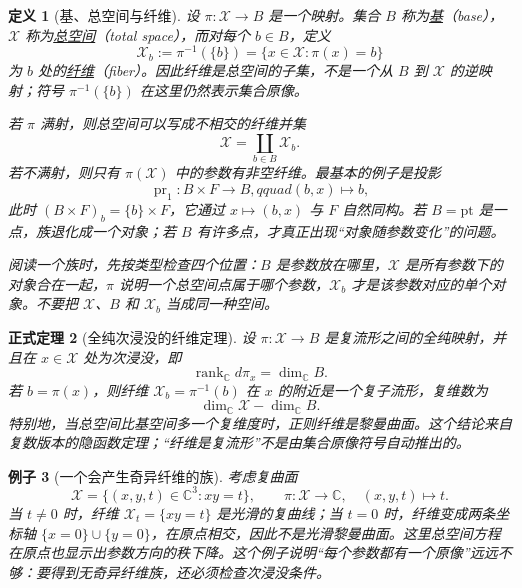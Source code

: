 \documentclass[UTF8,fontset=none,a4paper,11pt]{ctexart}
\theoremstyle{foundation-definition}
\newtheorem{definition}{定义}[section]
\theoremstyle{foundation-theorem}
\newtheorem{theorem}[definition]{正式定理}
\theoremstyle{foundation-proposition}
\theoremstyle{foundation-example}
\newtheorem{example}[definition]{例子}
\theoremstyle{foundation-remark}
\theoremstyle{foundation-theorem}
\newcommand{\term}[2]{\hyperref[#1]{#2}}
\begin{document}
\begin{definition}[基、总空间与纤维]\label{def:base-fiber}
设 \(\pi:\mathcal X\to B\) 是一个映射。集合 \(B\) 称为\term{def:base-fiber}{基}（base），\(\mathcal X\) 称为\term{def:base-fiber}{总空间}（total space），而对每个 \(b\in B\)，定义
\[
  \mathcal X_b:=\pi^{-1}(\{b\})
  =\{x\in\mathcal X:\pi(x)=b\}
\]
为 \(b\) 处的\term{def:base-fiber}{纤维}（fiber）。因此纤维是总空间的子集，不是一个从 \(B\) 到 \(\mathcal X\) 的逆映射；符号 \(\pi^{-1}(\{b\})\) 在这里仍然表示集合原像。

若 \(\pi\) 满射，则总空间可以写成不相交的纤维并集
\[
  \mathcal X=\coprod_{b\in B}\mathcal X_b.
\]
若不满射，则只有 \(\pi(\mathcal X)\) 中的参数有非空纤维。最基本的例子是投影
\[
  \operatorname{pr}_1:B\times F\to B,qquad (b,x)\longmapsto b,
\]
此时 \((B\times F)_b=\{b\}\times F\)，它通过 \(x\mapsto(b,x)\) 与 \(F\) 自然同构。若 \(B=\mathrm{pt}\) 是一点，族退化成一个对象；若 \(B\) 有许多点，才真正出现“对象随参数变化”的问题。

阅读一个族时，先按类型检查四个位置：\(B\) 是参数放在哪里，\(\mathcal X\) 是所有参数下的对象合在一起，\(\pi\) 说明一个总空间点属于哪个参数，\(\mathcal X_b\) 才是该参数对应的单个对象。不要把 \(\mathcal X\)、\(B\) 和 \(\mathcal X_b\) 当成同一种空间。
\end{definition}

\begin{theorem}[全纯次浸没的纤维定理]\label{thm:fiber-submanifold}
设 \(\pi:\mathcal X\to B\) 是复流形之间的全纯映射，并且在 \(x\in\mathcal X\) 处为次浸没，即
\[
  \operatorname{rank}_{\mathbb C}d\pi_x=\dim_{\mathbb C}B.
\]
若 \(b=\pi(x)\)，则纤维 \(\mathcal X_b=\pi^{-1}(b)\) 在 \(x\) 的附近是一个复子流形，复维数为
\[
  \dim_{\mathbb C}\mathcal X-\dim_{\mathbb C}B.
\]
特别地，当总空间比基空间多一个复维度时，正则纤维是黎曼曲面。这个结论来自复数版本的隐函数定理；“纤维是复流形”不是由集合原像符号自动推出的。
\end{theorem}

\begin{example}[一个会产生奇异纤维的族]
考虑复曲面
\[
  \mathcal X=\{(x,y,t)\in\mathbb C^3:xy=t\},
  \qquad \pi:\mathcal X\to\mathbb C,\quad (x,y,t)\longmapsto t.
\]
当 \(t\neq0\) 时，纤维 \(\mathcal X_t=\{xy=t\}\) 是光滑的复曲线；当 \(t=0\) 时，纤维变成两条坐标轴 \(\{x=0\}\cup\{y=0\}\)，在原点相交，因此不是光滑黎曼曲面。这里总空间方程在原点也显示出参数方向的秩下降。这个例子说明“每个参数都有一个原像”远远不够：要得到无奇异纤维族，还必须检查次浸没条件。
\end{example}
\end{document}
